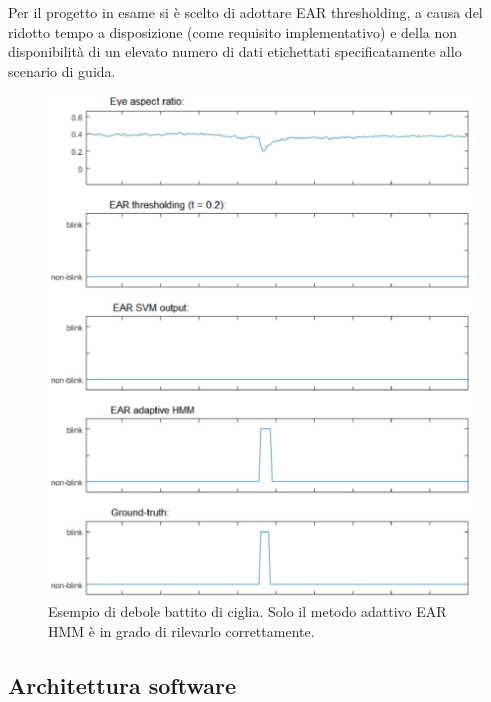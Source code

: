 \documentclass[12pt]{article}
\begin{document}
Per il progetto in esame si è scelto di adottare EAR thresholding, a causa del ridotto tempo a disposizione (come requisito implementativo) e della non disponibilità di un elevato numero di dati etichettati specificatamente allo scenario di guida.
\begin{figure}[!htb]
	\centering
	\includegraphics[scale=0.60]{eps/ear_methods.eps}
	\caption{Esempio di debole battito di ciglia. Solo il metodo adattivo EAR HMM è in grado di rilevarlo correttamente.}
	\label{fig:ear_methods}
\end{figure}

\subsection{Architettura software}
\end{document}

